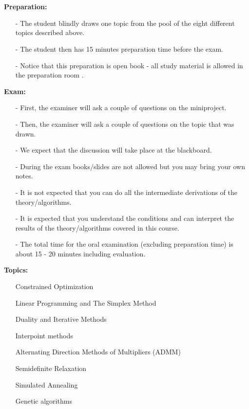 \documentclass[12pt,a4paper]{report}
\author{Frederik Appel Vardinghus-Nielsen}
\begin{document}
\\\\
\textbf{Preparation:}
\begin{itemize}
\setlength\itemsep{0em}
\item[-] The student blindly draws one topic from the pool of the eight different topics described above.
\item[-] The student then has 15 minutes preparation time before the exam.
\item[-] Notice that this preparation is open book - all study material is allowed in the preparation room .
\end{itemize}
\textbf{Exam:}
\begin{itemize}
\setlength\itemsep{0em}
\item[-] First, the examiner will ask a couple of questions on the miniproject.
\item[-] Then, the examiner will ask a couple of questions on the topic that was drawn.
\item[-] We expect that the discussion will take place at the blackboard.
\item[-] During the exam books/slides are not allowed but you may bring your own notes.
\item[-] It is not expected that you can do all the intermediate derivations of the theory/algorithms.
\item[-] It is expected that you understand the conditions and can interpret the results of the theory/algorithms covered in this course.
\item[-] The total time for the oral examination (excluding preparation time) is about 15 - 20 minutes including evaluation.
\end{itemize}
\textbf{Topics:}
\begin{itemize}
\setlength\itemsep{0em}
\item[] Constrained Optimization
\item[] Linear Programming and The Simplex Method
\item[] Duality and Iterative Methods
\item[] Interpoint methods
\item[] Alternating Direction Methods of Multipliers (ADMM)
\item[] Semidefinite Relaxation
\item[] Simulated Annealing
\item[] Genetic algorithms
\end{itemize}
\clearpage
{}\\\\
\end{document}
